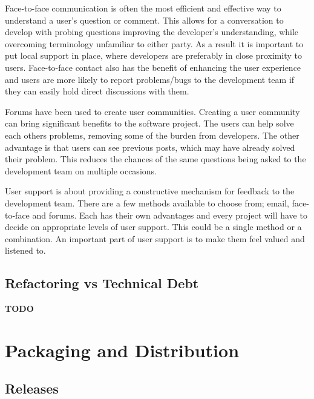\documentclass[jnr]{iosart2x}
\newcommand{\todo}[1]{\textbf{#1}}
\begin{document}
Face-to-face communication is often the most efficient and effective way to understand a user's question or comment.
This allows for a conversation to develop with probing questions improving the developer's understanding, while overcoming terminology unfamiliar to either party.
As a result it is important to put local support in place, where developers are preferably in close proximity to users.
Face-to-face contact also has the benefit of enhancing the user experience and users are more likely to report problems/bugs to the development team if they can easily hold direct discussions with them.

Forums have been used to create user communities.
Creating a user community can bring significant benefits to the software project.
The users can help solve each others problems, removing some of the burden from developers.
The other advantage is that users can see previous posts, which may have already solved their problem.
This reduces the chances of the same questions being asked to the development team on multiple occasions.

User support is about providing a constructive mechanism for feedback to the development team.
There are a few methods available to choose from; email, face-to-face and forums.
Each has their own advantages and every project will have to decide on appropriate levels of user support.
This could be a single method or a combination.
An important part of user support is to make them feel valued and listened to.

\subsection{Refactoring vs Technical Debt}
\label{Refactoring}

\todo{TODO}

\section{Packaging and Distribution}
\label{Packaging and Distribution}

\subsection{Releases}
\label{Releases}
\end{document}
